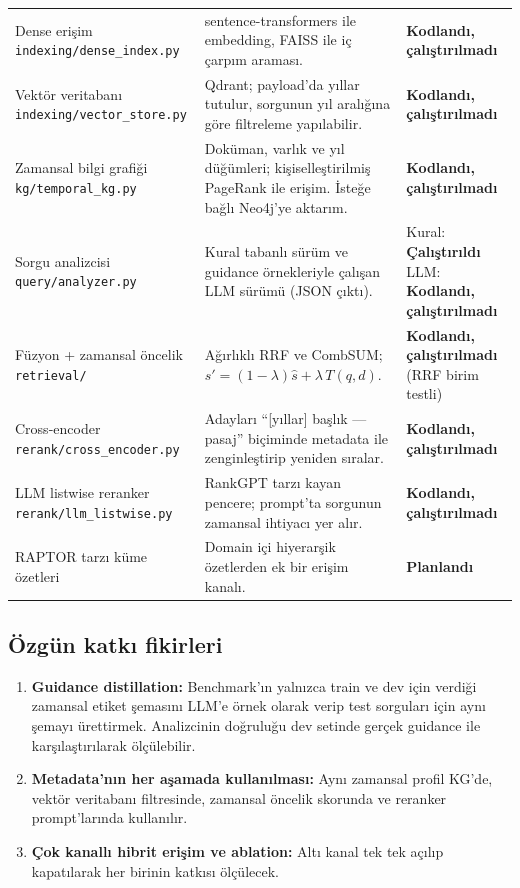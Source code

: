 \documentclass[11pt,a4paper]{article}
\newcommand{\OK}{\textcolor{ok}{\textbf{Çalıştırıldı}}}
\newcommand{\KOD}{\textcolor{wait}{\textbf{Kodlandı, çalıştırılmadı}}}
\newcommand{\PLAN}{\textcolor{plan}{\textbf{Planlandı}}}
\begin{document}
\begin{tabularx}{\textwidth}{>{\raggedright\arraybackslash}p{3.6cm} L >{\raggedright\arraybackslash}p{2.9cm}}
Dense erişim \newline\scriptsize\texttt{indexing/dense\_index.py} &
  sentence-transformers ile embedding, FAISS ile iç çarpım araması. & \KOD \\
Vektör veritabanı \newline\scriptsize\texttt{indexing/vector\_store.py} &
  Qdrant; payload'da yıllar tutulur, sorgunun yıl aralığına göre filtreleme yapılabilir. & \KOD \\
Zamansal bilgi grafiği \newline\scriptsize\texttt{kg/temporal\_kg.py} &
  Doküman, varlık ve yıl düğümleri; kişiselleştirilmiş PageRank ile erişim. İsteğe bağlı
  Neo4j'ye aktarım. & \KOD \\
Sorgu analizcisi \newline\scriptsize\texttt{query/analyzer.py} &
  Kural tabanlı sürüm ve guidance örnekleriyle çalışan LLM sürümü (JSON çıktı). & Kural: \OK
  \newline LLM: \KOD \\
Füzyon + zamansal öncelik \newline\scriptsize\texttt{retrieval/} &
  Ağırlıklı RRF ve CombSUM; $s' = (1-\lambda)\hat s + \lambda\,T(q,d)$. & \KOD{}
  \newline\scriptsize(RRF birim testli) \\
Cross-encoder \newline\scriptsize\texttt{rerank/cross\_encoder.py} &
  Adayları ``[yıllar] başlık --- pasaj'' biçiminde metadata ile zenginleştirip yeniden
  sıralar. & \KOD \\
LLM listwise reranker \newline\scriptsize\texttt{rerank/llm\_listwise.py} &
  RankGPT tarzı kayan pencere; prompt'ta sorgunun zamansal ihtiyacı yer alır. & \KOD \\
RAPTOR tarzı küme özetleri & Domain içi hiyerarşik özetlerden ek bir erişim kanalı. & \PLAN \\
\bottomrule
\end{tabularx}

\subsection{Özgün katkı fikirleri}
\begin{enumerate}
  \item \textbf{Guidance distillation:} Benchmark'ın yalnızca train ve dev için verdiği zamansal
        etiket şemasını LLM'e örnek olarak verip test sorguları için aynı şemayı ürettirmek.
        Analizcinin doğruluğu dev setinde gerçek guidance ile karşılaştırılarak ölçülebilir.
  \item \textbf{Metadata'nın her aşamada kullanılması:} Aynı zamansal profil KG'de, vektör
        veritabanı filtresinde, zamansal öncelik skorunda ve reranker prompt'larında kullanılır.
  \item \textbf{Çok kanallı hibrit erişim ve ablation:} Altı kanal tek tek açılıp kapatılarak
        her birinin katkısı ölçülecek.
\end{enumerate}
\end{document}
